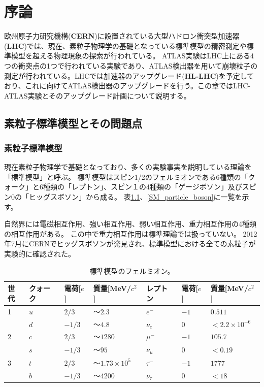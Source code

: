 \chapter{序論}
欧州原子力研究機構(\textbf{CERN})に設置されている大型ハドロン衝突型加速器(\textbf{LHC})では、現在、素粒子物理学の基礎となっている標準模型の精密測定や標準模型を超える物理現象の探索が行われている。
ATLAS実験はLHC上にある4つの衝突点の1つで行われている実験であり、ATLAS検出器を用いて崩壊粒子の測定が行われている。LHCでは加速器のアップグレード(\textbf{HL-LHC})を予定しており、これに向けてATLAS検出器のアップグレードを行う。この章ではLHC-ATLAS実験とそのアップグレード計画について説明する。

\section{素粒子標準模型とその問題点\cite{1-9}}
\subsection{素粒子標準模型}
現在素粒子物理学で基礎となっており、多くの実験事実を説明している理論を「標準模型」と呼ぶ。
標準模型はスピン1/2のフェルミオンである6種類の「クォーク」と6種類の「レプトン」、スピン１の4種類の「ゲージボソン」及びスピン0の「ヒッグスボソン」から成る。
表\ref{SM_particle_fermion}、\ref{SM_particle_boson}に一覧を示す。

自然界には電磁相互作用、強い相互作用、弱い相互作用、重力相互作用の4種類の相互作用がある。
この中で重力相互作用は標準理論では扱っていない。
2012年7月にCERNでヒッグスボソンが発見され、標準模型における全ての素粒子が実験的に確認された。

\begin{table}[tbp]
\begin{center}
\caption[標準模型のフェルミオン]{標準模型のフェルミオン。}
\label{SM_particle_fermion}
  \small
  \begin{tabular}{|l|lll|lll|} \hline
    世代 & クォーク & 電荷[$e$] & 質量[MeV/$c^2$]    & レプトン    & 電荷[$e$]   & 質量[MeV/$c^2$]      \\ \hline \hline
    1    & $u$      & $2/3$     & $〜2.3$            & $e^-$       & $-1$        & $0.511$              \\
         & $d$      & $-1/3$    & $〜4.8$            & $\nu_e$     & $0$         & $<2.2\times 10^{-6}$ \\ \hline
    2    & $c$      & $2/3$     & $〜1280$           & $\mu^-$     & $-1$        & $105.7$              \\
         & $s$      & $-1/3$    & $〜95$             & $\nu_\mu$   & $0$         & $<0.19$              \\ \hline
    3    & $t$      & $2/3$     & $〜1.73\times10^5$ & $\tau^-$    & $-1$        & $1777$               \\
         & $b$      & $-1/3$    & $〜4200$           & $\nu_\tau$  & $0$         & $<18$                \\ \hline
  \end{tabular}
\end{center}
\end{table}

